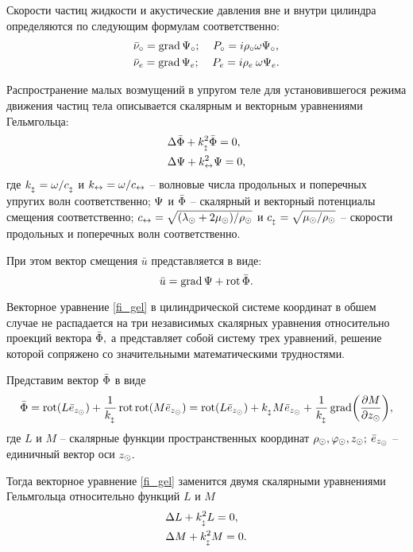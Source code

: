 Скорости частиц жидкости и акустические давления вне и внутри цилиндра определяются по следующим формулам соответственно:
\begin{align*}
&\bar{\nu}\c=\grad\P\c;\:\:\:\:\:P\c=i\r\c\omega\P\c,\\
&\bar{\nu}\en=\grad\P\en;\:\:\:\:\:P\en=i\r\en\:\omega\P\en.
\end{align*}

Распространение малых возмущений в упругом теле для установившегося режима движения частиц тела описывается скалярным и векторным уравнениями Гельмгольца:
\begin{align}
&\Lap\bar{\F}+k_{\popr}^2\bar{\F}=0,\\
&\Lap\P+k\prodol^2\P=0,\label{fi_gel}
\end{align}
где $k_{\popr}=\omega/c_{\popr}$ и $k\prodol=\omega/c\prodol$ -- волновые числа продольных и поперечных упругих волн соответственно; $\P$ и $\bar\F$ -- скалярный и векторный потенциалы смещения соответственно; $c\prodol=\sqrt{(\lambda\cyl+2\mu\cyl)/\r\cyl}$ и $c_{\popr}=\sqrt{\mu\cyl/\r\cyl}$ -- скорости продольных и поперечных волн соответственно.

При этом вектор смещения $\bar{u}$ представляется в виде:
\begin{equation}
\bar{u}=\grad\P+\rot\bar{\F}.
\end{equation}

Векторное уравнение \eqref{fi_gel} в цилиндрической системе координат в обшем случае не распадается на три независимых скалярных уравнения относительно проекций вектора $\bar{\F},$ а представляет собой систему трех уравнений, решение которой сопряжено со значительными математическими трудностями.

Представим вектор $\bar\F$ в виде
$$\bar\F=\rot(L\bar{e}_{z\cyl})+\frac1{k_{\popr}}\rot\rot(M\bar{e}_{z\cyl})=\rot(L\bar{e}_{z\cyl})+k_{\popr} M\bar{e}_{z\cyl}+\frac1{k_{\popr}}\grad\biggl(\frac{\partial M}{\partial z\cyl}\biggr),$$
где $L$ и $M$ -- скалярные функции пространственных координат $\r\cyl, \varphi\cyl, z\cyl;$
\newline
$\bar{e}_{z\cyl}$ -- единичный вектор оси $z\cyl.$

Тогда векторное уравнение \eqref{fi_gel} заменится двумя скалярными уравнениями Гельмгольца относительно функций $L$ и $M$
\begin{align*}
&\Lap L+k_{\popr}^2L=0,\\
&\Lap M+k_{\popr}^2M=0.
\end{align*}

